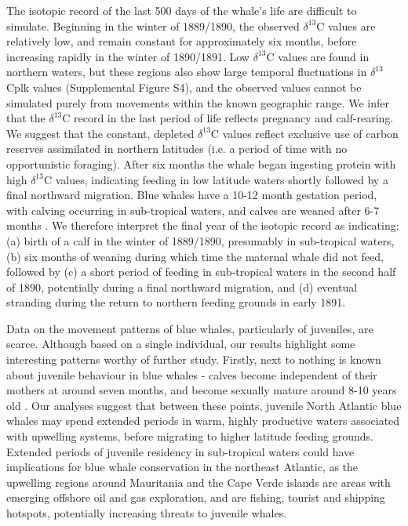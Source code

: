 \documentclass[a4paper,12pt]{article}
\begin{document}
The isotopic record of the last 500 days of the whale's life are difficult to simulate. 
Beginning in the winter of 1889/1890, the observed $\delta^{13}$C values are relatively low, and remain constant for approximately six months, before increasing rapidly in the winter of 1890/1891. 
Low $\delta^{13}$C values are found in northern waters, but these regions also show large temporal fluctuations in $\delta^{13}$Cplk values (Supplemental Figure S4), and the observed values cannot be simulated purely from movements within the known geographic range.
We infer that the $\delta^{13}$C record in the last period of life reflects pregnancy and calf-rearing. 
We suggest that the constant, depleted $\delta^{13}$C values reflect exclusive use of carbon reserves assimilated in northern latitudes (i.e. a period of time with no opportunistic foraging). 
After six months the whale began ingesting protein with high $\delta^{13}$C  values, indicating feeding in low latitude waters shortly followed by a final northward migration. 
Blue whales have a 10-12 month gestation period, with calving occurring in sub-tropical waters, and calves are weaned after 6-7 months \cite{handbook}. 
We therefore interpret the final year of the isotopic record as indicating: (a) birth of a calf in the winter of 1889/1890, presumably in sub-tropical waters, (b) six months of weaning during which time the maternal whale did not feed, followed by (c) a short period of feeding in sub-tropical waters in the second half of 1890, potentially during a final northward migration, and (d) eventual stranding during the return to northern feeding grounds in early 1891.

Data on the movement patterns of blue whales, particularly of juveniles, are scarce. 
Although based on a single individual, our results highlight some interesting patterns worthy of further study.
Firstly, next to nothing is known about juvenile behaviour in blue whales - calves become independent of their mothers at around seven months, and become sexually mature around 8-10 years old \cite{handbook}.
Our analyses suggest that between these points, juvenile North Atlantic blue whales may spend extended periods in warm, highly productive waters associated with upwelling systems, before migrating to higher latitude feeding grounds.
Extended periods of juvenile residency in sub-tropical waters could have implications for blue whale conservation in the northeast Atlantic, as the upwelling regions around Mauritania and the Cape Verde islands are areas with emerging offshore oil and gas exploration, and are fishing, tourist and shipping hotspots, potentially increasing threats to juvenile whales. 
\end{document}
